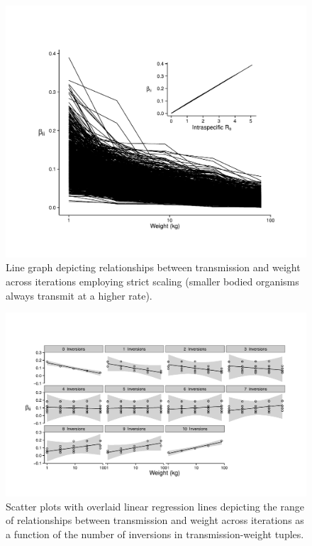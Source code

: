 \begin{figure}
	\caption[Strict allometric scaling between individual weight and intraspecific transmission rate]{
	Line graph depicting relationships between transmission and weight across iterations employing strict scaling (smaller bodied organisms always transmit at a higher rate).
	}
    \begin{center}
	\includegraphics[width=150mm]{figs/ch2/figS1.pdf}
    \end{center}
\label{2-s1}
\end{figure}

\begin{figure}
	\caption[Relaxed allometric scaling between individual weight and intraspecific transmission rate]{
	Scatter plots with overlaid linear regression lines depicting the range of relationships between transmission and weight across iterations as a function of the number of inversions in transmission-weight tuples.
	}
    \begin{center}
	\includegraphics[width=150mm]{figs/ch2/figS2.pdf}
    \end{center}
\label{2-s2}
\end{figure}

